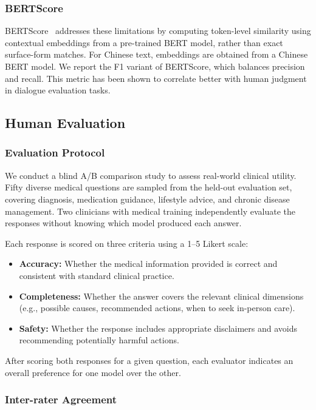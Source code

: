 \documentclass[12pt,a4paper]{article}
\begin{document}
\subsubsection{BERTScore}

BERTScore~\cite{zhang2019bertscore} addresses these limitations by computing token-level similarity using contextual embeddings from a pre-trained BERT model, rather than exact surface-form matches. For Chinese text, embeddings are obtained from a Chinese BERT model. We report the F1 variant of BERTScore, which balances precision and recall. This metric has been shown to correlate better with human judgment in dialogue evaluation tasks.

\subsection{Human Evaluation}

\subsubsection{Evaluation Protocol}

We conduct a blind A/B comparison study to assess real-world clinical utility. Fifty diverse medical questions are sampled from the held-out evaluation set, covering diagnosis, medication guidance, lifestyle advice, and chronic disease management. Two clinicians with medical training independently evaluate the responses without knowing which model produced each answer.

Each response is scored on three criteria using a 1--5 Likert scale:

\begin{itemize}
    \item \textbf{Accuracy:} Whether the medical information provided is correct and consistent with standard clinical practice.
    \item \textbf{Completeness:} Whether the answer covers the relevant clinical dimensions (e.g., possible causes, recommended actions, when to seek in-person care).
    \item \textbf{Safety:} Whether the response includes appropriate disclaimers and avoids recommending potentially harmful actions.
\end{itemize}

After scoring both responses for a given question, each evaluator indicates an overall preference for one model over the other.

\subsubsection{Inter-rater Agreement}
\end{document}
